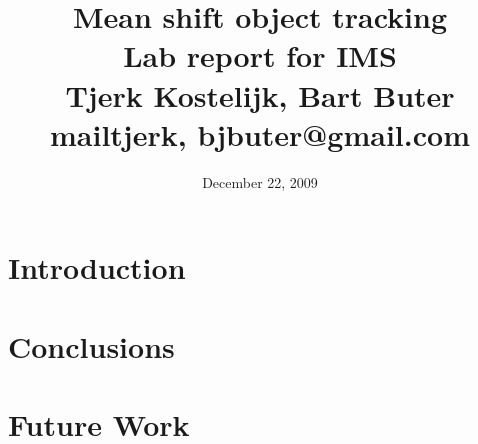 \documentclass[a4paper,11pt]{article}
\title{Mean shift object tracking\\ Lab report for IMS\\ Tjerk Kostelijk, Bart Buter\\{mailtjerk, bjbuter}@gmail.com}
\date{December 22, 2009}
\begin{document}
\maketitle
\section{Introduction}


\section{Conclusions} \label{sec:conc}

\section{Future Work} \label{sec:fut}

% 
% 
\end{document}
